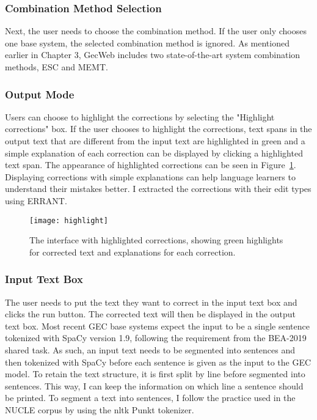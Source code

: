 \subsubsection{Combination Method Selection}

Next, the user needs to choose the combination method.
If the user only chooses one base system, the selected combination method is ignored.
As mentioned earlier in Chapter 3, GecWeb includes two state-of-the-art system combination methods, ESC and MEMT.

\subsubsection{Output Mode}

Users can choose to highlight the corrections by selecting the "Highlight corrections" box.
If the user chooses to highlight the corrections, text spans in the output text that are different from the input text are highlighted in green and a simple explanation of each correction can be displayed by clicking a highlighted text span.
The appearance of highlighted corrections can be seen in Figure~\ref{fig:highlight}.
Displaying corrections with simple explanations can help language learners to understand their mistakes better.
I extracted the corrections with their edit types using ERRANT.

\begin{figure}[htbp]
  \begin{center}
    \texttt{[image: highlight]}
  \end{center}
  \caption{The interface with highlighted corrections, showing green highlights for corrected text and explanations for each correction.}\label{fig:highlight} \end{figure}

\subsubsection{Input Text Box}

The user needs to put the text they want to correct in the input text box and clicks the run button.
The corrected text will then be displayed in the output text box.
Most recent GEC base systems expect the input to be a single sentence tokenized with SpaCy version 1.9, following the requirement from the BEA-2019 shared task.
As such, an input text needs to be segmented into sentences and then tokenized with SpaCy before each sentence is given as the input to the GEC model.
To retain the text structure, it is first split by line before segmented into sentences.
This way, I can keep the information on which line a sentence should be printed.
To segment a text into sentences, I follow the practice used in the NUCLE corpus by using the nltk Punkt
tokenizer.

